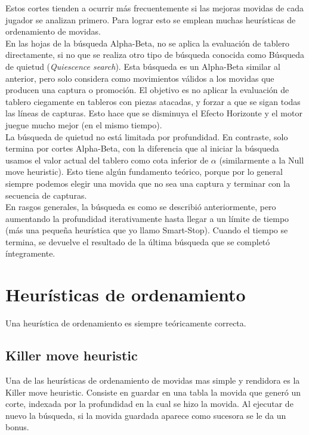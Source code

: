 \documentclass{article}
\begin{document}

Estos cortes tienden a ocurrir más frecuentemente si las mejoras
movidas de cada jugador se analizan primero. Para lograr esto se emplean
muchas heurísticas de ordenamiento de movidas.
\\

En las hojas de la búsqueda Alpha-Beta, no se aplica la evaluación
de tablero directamente, si no que se realiza otro tipo de búsqueda
conocida como Búsqueda de quietud (\emph{Quiescence search}). Esta
búsqueda es un Alpha-Beta similar al anterior, pero solo considera
como movimientos válidos a los movidas que producen una captura
o promoción. El objetivo es no aplicar la evaluación de tablero
ciegamente en tableros con piezas atacadas, y forzar a que se sigan
todas las líneas de capturas. Esto hace que se disminuya el Efecto
Horizonte y el motor juegue mucho mejor (en el mismo tiempo).
\\

La búsqueda de quietud no está limitada por profundidad. En contraste,
solo termina por cortes Alpha-Beta, con la diferencia que al iniciar
la búsqueda usamos el valor actual del tablero como cota inferior de
$\alpha$ (similarmente a la Null move heuristic). Esto tiene algún
fundamento teórico, porque por lo general siempre podemos elegir una
movida que no sea una captura y terminar con la secuencia de capturas.
\\

En rasgos generales, la búsqueda es como se describió anteriormente,
pero aumentando la profundidad iterativamente hasta llegar a un límite
de tiempo (más una pequeña heurística que yo llamo Smart-Stop).
Cuando el tiempo se termina, se devuelve el resultado de la última
búsqueda que se completó íntegramente.
\\

\section{Heurísticas de ordenamiento}

Una heurística de ordenamiento es siempre teóricamente correcta.

\subsection{Killer move heuristic}
Una de las heurísticas de ordenamiento de movidas mas simple y
rendidora es la Killer move heuristic. Consiste en guardar en una tabla
la movida que generó un corte, indexada por la profundidad en la cual
se hizo la movida. Al ejecutar de nuevo la búsqueda, si la movida
guardada aparece como sucesora se le da un bonus.
\\
\end{document}
